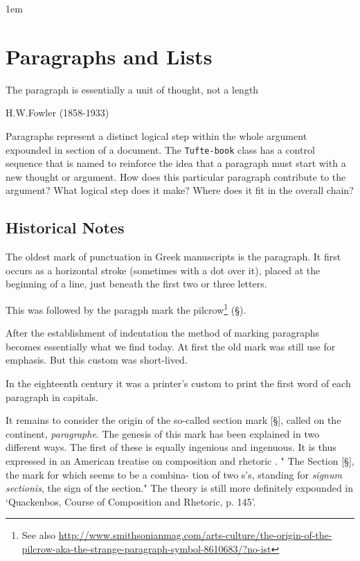 \parindent1em

\chapter{Paragraphs and Lists}

\epigraph{The paragraph is essentially a unit of thought, not a length}{H.W.Fowler (1858-1933)}

\noindent Paragraphs represent a distinct logical step within the whole argument expounded in section of a document. The \texttt{Tufte-book} class has a control sequence that is named \cmd{\newthought} to reinforce the idea that a paragraph must start with a new thought or argument. How does this particular paragraph contribute to the argument? 
What logical step does it make? Where does it fit in the overall chain?

\section{Historical Notes}

The oldest mark of punctuation in Greek manuscripts is the paragraph. It first occurs as a horizontal stroke (sometimes with a dot over it), placed at the beginning of a line, just beneath the first two or three letters.

This was followed by the paragph mark the pilcrow\footnote{See also \protect\url{http://www.smithsonianmag.com/arts-culture/the-origin-of-the-pilcrow-aka-the-strange-paragraph-symbol-8610683/?no-ist}} (\S). 

After the establishment of indentation the method of marking paragraphs becomes essentially what we find today. At first the old mark was still use for emphasis. But this custom was short-lived.

In the eighteenth century it was a printer’s custom to print the first word of each paragraph in capitals. 

It remains to consider the origin of the so-called section 
mark [\S], called on the continent, \emph{paragraphe}. The genesis of 
this mark has been explained in two different ways. The first 
of these is equally ingenious and ingenuous. It is thus 
expressed in an American treatise on composition and rhetoric . 
" The Section [\S], the mark for which seems to be a combina- 
tion of two s's, standing for \emph{signum sectionis}, the sign of the 
section." The theory is still more definitely expounded  in 
`Quackenbos, Course of Composition and Rhetoric, p. 145'. 


